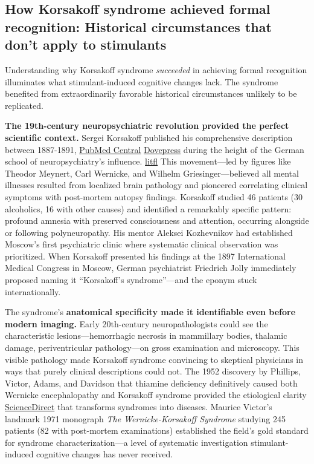 \subsection{How Korsakoff syndrome achieved formal recognition: Historical circumstances that don't apply to stimulants}\label{16_missing_syndrome-how-korsakoff-syndrome-achieved-formal-recognition-historical-circumstances-that-dont-apply-to-stimulants}

Understanding why Korsakoff syndrome \emph{succeeded} in achieving formal recognition illuminates what stimulant-induced cognitive changes lack. The syndrome benefited from extraordinarily favorable historical circumstances unlikely to be replicated.

\textbf{The 19th-century neuropsychiatric revolution provided the perfect scientific context.} Sergei Korsakoff published his comprehensive description between 1887-1891, \href{https://pmc.ncbi.nlm.nih.gov/articles/PMC5708199/}{PubMed Central} \href{https://www.dovepress.com/korsakoffs-syndrome-a-critical-review-peer-reviewed-fulltext-article-NDT}{Dovepress} during the height of the German school of neuropsychiatry's influence. \href{https://litfl.com/sergei-sergeievich-korsakoff/}{litfl} This movement---led by figures like Theodor Meynert, Carl Wernicke, and Wilhelm Griesinger---believed all mental illnesses resulted from localized brain pathology and pioneered correlating clinical symptoms with post-mortem autopsy findings. Korsakoff studied 46 patients (30 alcoholics, 16 with other causes) and identified a remarkably specific pattern: profound amnesia with preserved consciousness and attention, occurring alongside or following polyneuropathy. His mentor Aleksei Kozhevnikov had established Moscow's first psychiatric clinic where systematic clinical observation was prioritized. When Korsakoff presented his findings at the 1897 International Medical Congress in Moscow, German psychiatrist Friedrich Jolly immediately proposed naming it ``Korsakoff's syndrome''---and the eponym stuck internationally.

The syndrome's \textbf{anatomical specificity made it identifiable even before modern imaging.} Early 20th-century neuropathologists could see the characteristic lesions---hemorrhagic necrosis in mammillary bodies, thalamic damage, periventricular pathology---on gross examination and microscopy. This visible pathology made Korsakoff syndrome convincing to skeptical physicians in ways that purely clinical descriptions could not. The 1952 discovery by Phillips, Victor, Adams, and Davidson that thiamine deficiency definitively caused both Wernicke encephalopathy and Korsakoff syndrome provided the etiological clarity \href{https://www.sciencedirect.com/topics/biochemistry-genetics-and-molecular-biology/korsakoffs-syndrome}{ScienceDirect} that transforms syndromes into diseases. Maurice Victor's landmark 1971 monograph \emph{The Wernicke-Korsakoff Syndrome} studying 245 patients (82 with post-mortem examinations) established the field's gold standard for syndrome characterization---a level of systematic investigation stimulant-induced cognitive changes has never received.

